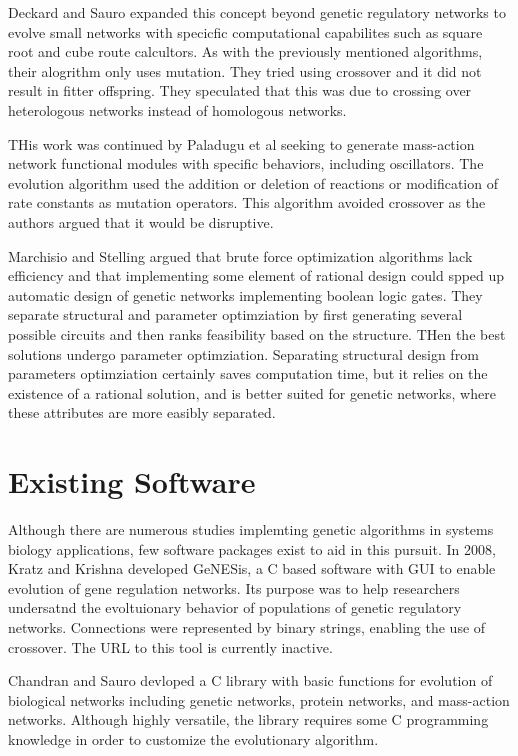 \documentclass[12pt]{report}
\begin{document}
Deckard and Sauro expanded this concept beyond genetic regulatory networks to evolve small networks with specicfic computational capabilites such as square root and cube route calcultors. As with the previously mentioned algorithms, their alogrithm only uses mutation. They tried using crossover and it did not result in fitter offspring. They speculated that this was due to crossing over heterologous networks instead of homologous networks.

THis work was continued by Paladugu et al seeking to generate mass-action network functional modules with specific behaviors, including oscillators. The evolution algorithm used the addition or deletion of reactions or modification of rate constants as mutation operators. This algorithm avoided crossover as the authors argued that it would be disruptive.

Marchisio and Stelling argued that brute force optimization algorithms lack efficiency and that implementing some element of rational design could spped up automatic design of genetic networks implementing boolean logic gates. They separate structural and parameter optimziation by first generating several possible circuits and then ranks feasibility based on the structure. THen the best solutions undergo parameter optimziation. Separating structural design from parameters optimziation certainly saves computation time, but it relies on the existence of a rational solution, and is better suited for genetic networks, where these attributes are more easibly separated.



\section{Existing Software}

Although there are numerous studies implemting genetic algorithms in systems biology applications, few software packages exist to aid in this pursuit. In 2008, Kratz and Krishna developed GeNESis, a C based software with GUI to enable evolution of gene regulation networks. Its purpose was to help researchers undersatnd the evoltuionary behavior of populations of genetic regulatory networks. Connections were represented by binary strings, enabling the use of crossover. The URL to this tool is currently inactive.

Chandran and Sauro devloped a C library with basic functions for evolution of biological networks including genetic networks, protein networks, and mass-action networks. Although highly versatile, the library requires some C programming knowledge in order to customize the evolutionary algorithm.
\end{document}
